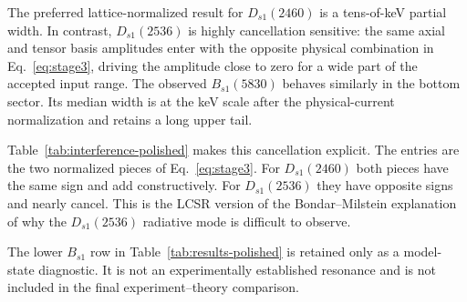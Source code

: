 \documentclass[11pt]{article}
\newcommand{\Dsone}{D_{s1}}
\newcommand{\Bsone}{B_{s1}}
\newcommand{\GeV}{\mathrm{GeV}}
\begin{document}
The preferred lattice-normalized result for $\Dsone(2460)$ is a tens-of-keV
partial width.  In contrast, $\Dsone(2536)$ is highly cancellation sensitive:
the same axial and tensor basis amplitudes enter with the opposite physical
combination in Eq.~\eqref{eq:stage3}, driving the amplitude close to zero for a
wide part of the accepted input range.  The observed $\Bsone(5830)$ behaves
similarly in the bottom sector.  Its median width is at the keV scale after the
physical-current normalization and retains a long upper tail.

Table~\ref{tab:interference-polished} makes this cancellation explicit.  The
entries are the two normalized pieces of Eq.~\eqref{eq:stage3}.  For
$\Dsone(2460)$ both pieces have the same sign and add constructively.  For
$\Dsone(2536)$ they have opposite signs and nearly cancel.  This is the LCSR
version of the Bondar--Milstein explanation of why the $\Dsone(2536)$ radiative
mode is difficult to observe.

\begin{table}[htbp]
  \centering
  \caption{Central lattice-photon benchmark at the midpoint of the selected
  transition window.  The $2460$ pieces remain constructive and the $2536$
  pieces remain destructive; the angle changes the distance from the
  cancellation near $31.37^\circ$.  All $G$ values are in $\GeV^{-1}$.}
  \label{tab:interference-polished}
\end{table}

The lower $\Bsone$ row in Table~\ref{tab:results-polished} is retained only as
a model-state diagnostic.  It is not an experimentally established resonance
and is not included in the final experiment--theory comparison.
\end{document}
